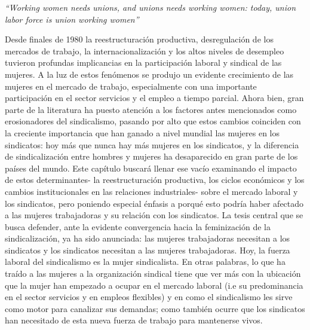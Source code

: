 \documentclass[
]{book}
\begin{document}
\emph{``Working women needs unions, and unions needs working women: today, union labor force is union working women''}

Desde finales de 1980 la reestructuración productiva, desregulación de los mercados de trabajo, la internacionalización y los altos niveles de desempleo tuvieron profundas implicancias en la participación laboral y sindical de las mujeres. A la luz de estos fenómenos se produjo un evidente crecimiento de las mujeres en el mercado de trabajo, especialmente con una importante participación en el sector servicios y el empleo a tiempo parcial. Ahora bien, gran parte de la literatura ha puesto atención a los factores antes mencionados como erosionadores del sindicalismo, pasando por alto que estos cambios coinciden con la creciente importancia que han ganado a nivel mundial las mujeres en los sindicatos: hoy más que nunca hay más mujeres en los sindicatos, y la diferencia de sindicalización entre hombres y mujeres ha desaparecido en gran parte de los países del mundo.
Este capítulo buscará llenar ese vacío examinando el impacto de estos determinantes- la reestructuración productiva, los ciclos económicos y los cambios institucionales en las relaciones industriales- sobre el mercado laboral y los sindicatos, pero poniendo especial énfasis a porqué esto podría haber afectado a las mujeres trabajadoras y su relación con los sindicatos. La tesis central que se busca defender, ante la evidente convergencia hacia la feminización de la sindicalización, ya ha sido anunciada: las mujeres trabajadoras necesitan a los sindicatos y los sindicatos necesitan a las mujeres trabajadoras. Hoy, la fuerza laboral del sindicalismo es la mujer sindicalista. En otras palabras, lo que ha traído a las mujeres a la organización sindical tiene que ver más con la ubicación que la mujer han empezado a ocupar en el mercado laboral (i.e su predominancia en el sector servicios y en empleos flexibles) y en como el sindicalismo les sirve como motor para canalizar sus demandas; como también ocurre que los sindicatos han necesitado de esta nueva fuerza de trabajo para mantenerse vivos.
\end{document}
